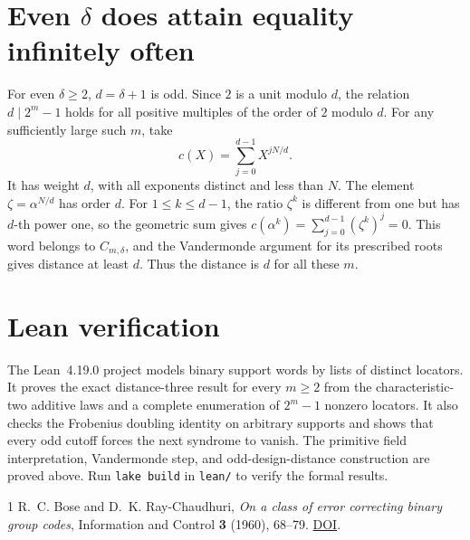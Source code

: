 \documentclass[11pt]{article}
\begin{document}
\section*{Even \(\delta\) does attain equality infinitely often}

For even \(\delta\ge2\), \(d=\delta+1\) is odd. Since \(2\) is a unit
modulo \(d\), the relation \(d\mid 2^m-1\) holds for all positive
multiples of the order of \(2\) modulo \(d\). For any sufficiently
large such \(m\), take
\[
  c(X)=\sum_{j=0}^{d-1} X^{jN/d}.
\]
It has weight \(d\), with all exponents distinct and less than \(N\).
The element \(\zeta=\alpha^{N/d}\) has order \(d\). For
\(1\le k\le d-1\), the ratio \(\zeta^k\) is different from one
but has \(d\)-th power one, so the geometric sum gives
\(c(\alpha^k)=\sum_{j=0}^{d-1}(\zeta^k)^j=0\).
This word belongs to \(C_{m,\delta}\), and the Vandermonde argument
for its prescribed roots gives distance at least \(d\). Thus the
distance is \(d\) for all these \(m\).

\section*{Lean verification}

The Lean~4.19.0 project models binary support words by lists of
distinct locators. It proves the exact distance-three result for
every \(m\ge2\) from the characteristic-two additive laws and a
complete enumeration of \(2^m-1\) nonzero locators. It also checks the
Frobenius doubling identity on arbitrary supports and shows that
every odd cutoff forces the next syndrome to vanish. The primitive
field interpretation, Vandermonde step, and odd-design-distance
construction are proved above. Run \verb|lake build| in \verb|lean/|
to verify the formal results.

\begin{thebibliography}{1}
R.~C. Bose and D.~K. Ray-Chaudhuri,
\emph{On a class of error correcting binary group codes},
Information and Control \textbf{3} (1960), 68--79.
\href{https://doi.org/10.1016/S0019-9958(60)90287-4}{DOI}.
\end{thebibliography}
\end{document}
